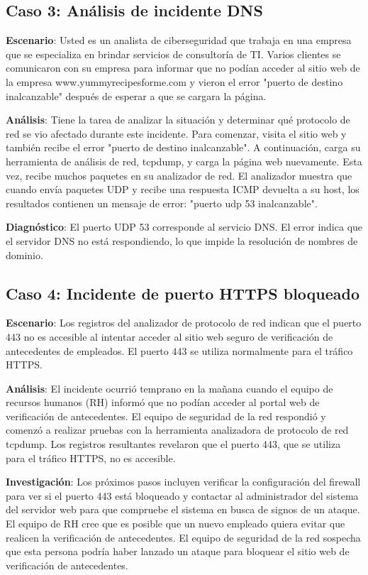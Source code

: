 \subsection{Caso 3: Análisis de incidente DNS}

\textbf{Escenario}: Usted es un analista de ciberseguridad que trabaja en una empresa que se especializa en brindar servicios de consultoría de TI. Varios clientes se comunicaron con su empresa para informar que no podían acceder al sitio web de la empresa www.yummyrecipesforme.com y vieron el error "puerto de destino inalcanzable" después de esperar a que se cargara la página.

\textbf{Análisis}: Tiene la tarea de analizar la situación y determinar qué protocolo de red se vio afectado durante este incidente. Para comenzar, visita el sitio web y también recibe el error "puerto de destino inalcanzable". A continuación, carga su herramienta de análisis de red, tcpdump, y carga la página web nuevamente. Esta vez, recibe muchos paquetes en su analizador de red. El analizador muestra que cuando envía paquetes UDP y recibe una respuesta ICMP devuelta a su host, los resultados contienen un mensaje de error: "puerto udp 53 inalcanzable".

\textbf{Diagnóstico}: El puerto UDP 53 corresponde al servicio DNS. El error indica que el servidor DNS no está respondiendo, lo que impide la resolución de nombres de dominio.

\subsection{Caso 4: Incidente de puerto HTTPS bloqueado}

\textbf{Escenario}: Los registros del analizador de protocolo de red indican que el puerto 443 no es accesible al intentar acceder al sitio web seguro de verificación de antecedentes de empleados. El puerto 443 se utiliza normalmente para el tráfico HTTPS.

\textbf{Análisis}: El incidente ocurrió temprano en la mañana cuando el equipo de recursos humanos (RH) informó que no podían acceder al portal web de verificación de antecedentes. El equipo de seguridad de la red respondió y comenzó a realizar pruebas con la herramienta analizadora de protocolo de red tcpdump. Los registros resultantes revelaron que el puerto 443, que se utiliza para el tráfico HTTPS, no es accesible.

\textbf{Investigación}: Los próximos pasos incluyen verificar la configuración del firewall para ver si el puerto 443 está bloqueado y contactar al administrador del sistema del servidor web para que compruebe el sistema en busca de signos de un ataque. El equipo de RH cree que es posible que un nuevo empleado quiera evitar que realicen la verificación de antecedentes. El equipo de seguridad de la red sospecha que esta persona podría haber lanzado un ataque para bloquear el sitio web de verificación de antecedentes.


